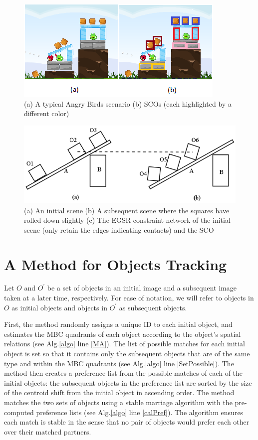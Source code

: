 \documentclass[letterpaper]{article}
\begin{document}
\begin{figure}[h!]
\centering\includegraphics[scale=0.7]{SCOScenario.png}\caption{(a) A typical Angry Birds scenario (b) SCOs (each highlighted by a different color)}
\label{SCOExample}
\end{figure}

\begin{figure}[h!]
\centering\includegraphics[scale=0.3]{SCOScenario_2.png}\caption{(a) An initial scene (b) A subsequent scene where the squares have rolled down slightly (c) The EGSR constraint network of the initial scene (only retain the edges indicating contacts) and the SCO}
\label{SCOExample_2}
\end{figure}


\section{A Method for Objects Tracking}
Let $O$ and $O^{\prime}$ be a set of objects in an initial image and a subsequent image taken at a later time, respectively. For ease of notation, we will refer to objects in $O$ as initial objects and objects in $O^{\prime}$ as subsequent objects.

First, the method randomly assigns a unique ID to each initial object, and estimates the MBC quadrants of each object according to the object's spatial relations (see Alg.\ref{algo} line \ref{MA}). The list of possible matches for each initial object is set so that it contains only the subsequent objects that are of the same type and within the MBC quadrants (see Alg.\ref{algo} line \ref{SetPossible}). The method then creates a preference list from the possible matches of each of the initial objects: the subsequent objects in the preference list are sorted by the size of the centroid shift from the initial object in ascending order. The method matches the two sets of objects using a stable marriage algorithm \cite{gale1962college} with the pre-computed preference lists (see Alg.\ref{algo} line \ref{calPref}). The algorithm ensures each match is stable in the sense that no pair of objects would prefer each other over their matched partners. 
\end{document}
